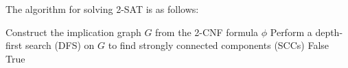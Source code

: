 \documentclass[a4paper, UTF-8]{article}
\theoremstyle{plain}
\begin{document}
The algorithm for solving 2-SAT is as follows:
\begin{algorithm}[H]
  \caption{2-SAT Algorithm}
  \begin{algorithmic}[1]
      \State Construct the implication graph $G$ from the 2-CNF formula $\phi$
      \State Perform a depth-first search (DFS) on $G$ to find strongly connected components (SCCs)
          \State \Return False 
        \EndIf
      \EndFor
      \State \Return True 
    \EndProcedure
  \end{algorithmic}
\end{algorithm}
\end{document}
